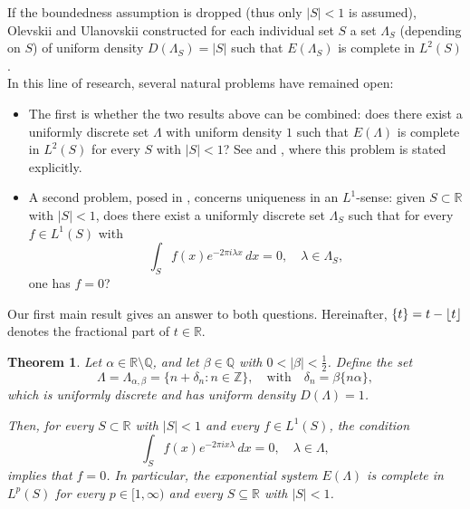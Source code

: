 \documentclass[reqno,a4paper,12pt]{amsart}
\numberwithin{equation}{section}
\newtheorem{theorem}[definition]{Theorem}
\def\Z{{\mathbb Z}}
\def\R{{\mathbb R}}
\def\Q{{\mathbb Q}}
\newcommand\1{\mathds{1}}
\DeclarePairedDelimiter\floor{\lfloor}{\rfloor}
\begin{document}
If the boundedness assumption is dropped (thus only $|S| < 1$ is assumed), Olevskii and Ulanovskii \cite{OlevskiiUlanovskii2011} constructed for each individual set $S$ a set $\Lambda_S$ (depending on $S$) of uniform density $D(\Lambda_S)=|S|$ such that $E(\Lambda_S)$ is complete in $L^2(S)$.\\
In this line of research, several natural problems have remained open:
\begin{itemize}
    \item The first is whether the two results above can be combined: does there exist a uniformly discrete set $\Lambda$ with uniform density $1$ such that $E(\Lambda)$ is complete in $L^2(S)$ for every $S$ with $|S|<1$? See \cite[Section 7.2]{OlevskiiUlanovskii2017} and \cite[Section 12]{OlevskiiUlanovskii2020}, where this problem is stated explicitly.
    \item A second problem, posed in \cite[Section~7.2, Question~3]{OlevskiiUlanovskii2017}, concerns uniqueness in an $L^1$-sense: given $S\subset\R$ with $|S| < 1$, does there exist a uniformly discrete set $\Lambda_S$ such that for every $f \in L^1(S)$ with
$$
\int_S f(x) e^{-2\pi i \lambda x} \, dx = 0, \quad \lambda \in \Lambda_S,
$$
one has $f=0$?
\end{itemize}
Our first main result gives an answer to both questions.
Hereinafter, $\{t\} = t - \floor{t}$ denotes the fractional part of $t \in \R$.


\begin{theorem}\label{thm:universal}
    Let $\alpha \in \R \setminus \Q$, and let $\beta\in \mathbb Q$ with $0 < \lvert \beta\rvert <\frac12$. Define the set
    $$
    \Lambda = \Lambda_{\alpha,\beta}=\{ n+ \delta_n : n \in \Z \}, \quad \mbox{with}\quad  \delta_n= \beta \{n\alpha\},
    $$
    which is uniformly discrete and has uniform density $D(\Lambda) = 1$.
    
 Then, for every $S \subset \R$ with $|S| < 1$ and every $f \in L^1(S)$, the condition
    $$
    \int_S f(x) e^{-2\pi i x \lambda} \, dx = 0, \quad \lambda \in \Lambda,
    $$
    implies that $f=0$. In particular, the exponential system $E(\Lambda)$ is complete in $L^p(S)$ for every $p \in [1,\infty)$ and every $S \subseteq \R$ with $|S| < 1$.
\end{theorem}
\end{document}
